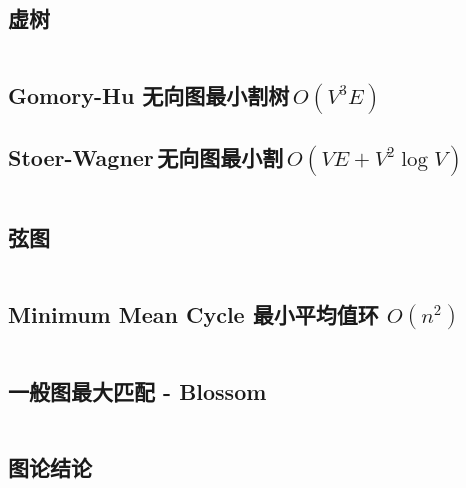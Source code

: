 \documentclass[titlepage, a4paper, 11pt]{article}
\begin{document}
\begin{spacing}{1.15}
				\subsection{虚树}
				\inputminted{cpp}{src/TreeandGraph/虚树.cpp}
				
				\subsection{Gomory-Hu 无向图最小割树\,$O(V ^ 3 E)$}
					
				\subsection{Stoer-Wagner\,无向图最小割\,$O(VE + V ^ 2 \log V)$}
					\inputminted{cpp}{src/yzh/Stoer-Wagner.cpp}
				\subsection{弦图}
					
					\inputminted{cpp}{src/TreeandGraph/弦图.cpp}
				\subsection{Minimum Mean Cycle 最小平均值环 $O(n^2)$}
					\inputminted{cpp}{src/TreeandGraph/MeanCycle.cpp}
				\subsection{一般图最大匹配 - Blossom}
					\inputminted{cpp}{src/TreeandGraph/Blossom.cpp}
				\subsection{图论结论}
					
					
					
					
					
					

\end{spacing}
\end{document}
